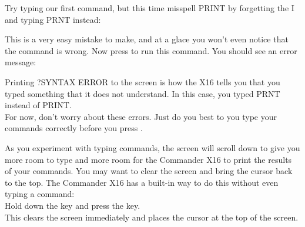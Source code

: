 Try typing our first command, but this time misspell {\ttfamily PRINT} by
forgetting the {\ttfamily I} and typing {\ttfamily PRNT} instead:


This is a very easy mistake to make, and at a glace you won't even notice that
the command is wrong.  Now press \returnkey to run this command.  You should
see an error message:

{
	\raggedleft
}


Printing {\ttfamily ?SYNTAX ERROR} to the screen is how the X16 tells you that
you typed something that it does not understand.  In this case, you typed
{\ttfamily PRNT} instead of {\ttfamily PRINT}.\\

For now, don't worry about these errors.  Just do you best to you type your
commands correctly before you press \returnkey.

As you experiment with typing commands, the screen will scroll down to give you
more room to type and more room for the Commander X16 to print the results of
your commands.  You may want to clear the screen and bring the cursor back to
the top.  The Commander X16 has a built-in way to do this without even typing a
command:\\

Hold down the \shiftkey key and press the \clrhomekey key.\\

This clears the screen immediately and places the cursor at the top of the
screen.\\



